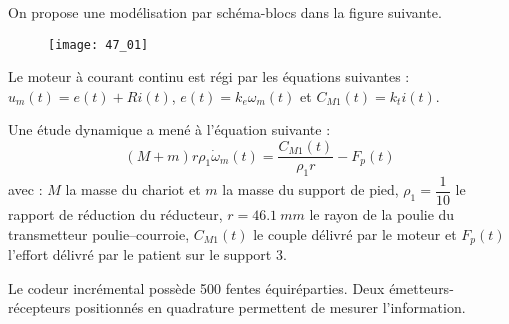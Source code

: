 \normaltrue \difficilefalse \tdifficilefalse
\correctiontrue

\setcounter{question}{0}%
\ifcorrection
\else
{}
\fi



\ifprof
\else
On propose une modélisation par schéma-blocs dans la figure suivante. 
\begin{figure}[!h]
\centering
{\texttt{[image: 47\_01]}}
\end{figure}




Le moteur à courant continu est régi par les équations suivantes :
$ u_m(t)=e(t)+Ri(t)$, $e(t)=k_e\omega_m(t)$ et $C_{M1}(t)=k_t i(t)$. 

Une étude dynamique a mené à l'équation suivante : 
$$\left(M+m\right)r\rho_1 \dot{\omega}_m(t)=\dfrac{C_{M1}(t)}{\rho_1 r}-F_p(t)$$ avec : $M$ la masse du chariot et $m$ la masse du support de pied, $\rho_1=\dfrac{1}{10}$ le rapport de réduction du réducteur, $r=\SI{46,1}{mm}$ le rayon de la poulie du transmetteur poulie--courroie, $C_{M1}(t)$ le couple délivré par le moteur et $F_p(t)$ l'effort délivré par le patient sur le support 3. 

Le codeur incrémental possède 500 fentes équiréparties. Deux émetteurs-récepteurs positionnés en quadrature permettent de mesurer l'information. 
\fi

